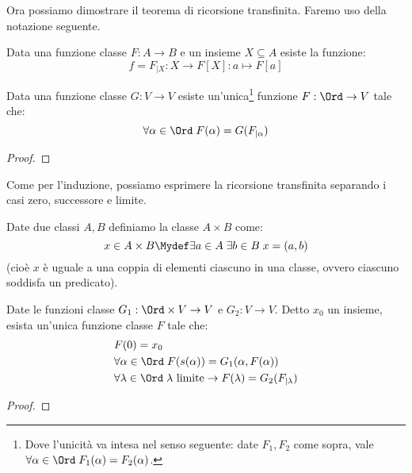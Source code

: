 \documentclass[11pt]{scrartcl}
\begin{document}
Ora possiamo dimostrare il teorema di ricorsione transfinita. Faremo uso della notazione seguente.

\begin{notation}
	Data una funzione classe $F : A \rightarrow B$ e un insieme $X \subseteq A$ esiste la funzione:
	\[ f = F_{|X} : X \rightarrow F[X] : a \mapsto F[a]
		\]
\end{notation}


\begin{theorem}
	\label{ric_transf1}
	Data una funzione classe $G : V \rightarrow V$ esiste
	un'unica\footnote{Dove l'unicità va intesa nel senso seguente: date $F_1,F_2$ come sopra,
	vale $\forall \alpha \in \Ord \; F_1(\alpha) = F_2 (\alpha)$.} funzione $F : \Ord \rightarrow V$ tale che:
	\[ \forall \alpha \in \Ord \; F(\alpha) = G(F_{|\alpha})
		\]
\end{theorem}

\begin{proof}
	
\end{proof}

Come per l'induzione, possiamo esprimere la ricorsione transfinita separando i casi zero, successore e limite.

\begin{definition}
	Date due classi $A,B$ definiamo la classe $A \times B$ come:
	\[ x \in A \times B \Mydef \exists a \in A \; \exists b \in B \; x = (a,b)
		\]
	(cioè $x$ è uguale a una coppia di elementi ciascuno in una classe, ovvero ciascuno soddisfa un predicato).
\end{definition}

\begin{corollary}
	\label{ric_transf2}
	Date le funzioni classe $G_1 : \Ord \times V \rightarrow V$ e $G_2 : V \rightarrow V$. Detto $x_0$ un insieme, esista un'unica funzione classe $F$ tale che:
	\begin{align*}
		& F(0) = x_0 \\
		& \forall \alpha \in \Ord \; F(s(\alpha)) = G_1(\alpha,F(\alpha)) \\
		& \forall \lambda \in \Ord \; \text{$\lambda$ limite} \rightarrow F(\lambda) = G_2(F_{|\lambda})
	\end{align*}
\end{corollary}

\begin{proof}
	
\end{proof}
\end{document}
